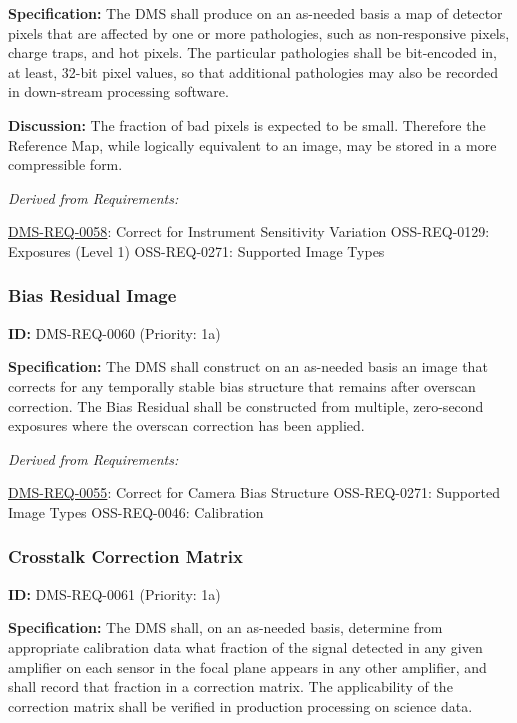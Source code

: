 \documentclass[SE,toc,lsstdraft]{lsstdoc}
\begin{document}
\textbf{Specification: }The DMS shall produce on an as-needed basis a map of detector pixels that are affected by one or more pathologies, such as non-responsive pixels, charge traps, and hot pixels. The particular pathologies shall be bit-encoded in, at least, 32-bit pixel values, so that additional pathologies may also be recorded in down-stream processing software.

\textbf{Discussion:} The fraction of bad pixels is expected to be small. Therefore the Reference Map, while logically equivalent to an image, may be stored in a more compressible form.

\emph{Derived from Requirements:}

\hyperref[DMS-REQ-0058]{DMS-REQ-0058}:
Correct for Instrument Sensitivity Variation \newline
OSS-REQ-0129:
Exposures (Level 1) \newline
OSS-REQ-0271:
Supported Image Types \newline

\subsubsection{Bias Residual Image}

\label{DMS-REQ-0060}
\textbf{ID:} DMS-REQ-0060 (Priority: 1a)

\textbf{Specification:} The DMS shall construct on an as-needed basis an image that corrects for any temporally stable bias structure that remains after overscan correction. The Bias Residual shall be constructed from multiple, zero-second exposures where the overscan correction has been applied.

\emph{Derived from Requirements:}

\hyperref[DMS-REQ-0055]{DMS-REQ-0055}:
Correct for Camera Bias Structure \newline
OSS-REQ-0271:
Supported Image Types \newline
OSS-REQ-0046:
Calibration \newline

\subsubsection{Crosstalk Correction Matrix}

\label{DMS-REQ-0061}
\textbf{ID:} DMS-REQ-0061 (Priority: 1a)

\textbf{Specification:} The DMS shall, on an as-needed basis, determine from appropriate calibration data what fraction of the signal detected in any given amplifier on each sensor in the focal plane appears in any other amplifier, and shall record that fraction in a correction matrix. The applicability of the correction matrix shall be verified in production processing on science data.
\end{document}
